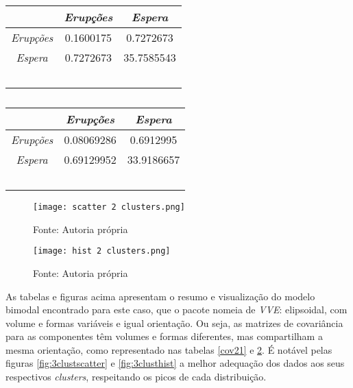 \documentclass[12pt]{article}
\begin{document}
\begin{table}[H]
    \begin{minipage}{0.55\textwidth}
        \centering
        \begin{tabular}{c|cc}
        {} & \textit{Erupções} & \textit{Espera} \\
        \hline
        \textit{Erupções} & 0.1600175 & 0.7272673 \\
        \textit{Espera} & 0.7272673 & 35.7585543 \\
        \hline
        \
        \end{tabular}
        \caption{}\label{cov21}
    \end{minipage}%
    \begin{minipage}{0.55\textwidth}
        \centering
        \begin{tabular}{c|cc}
        {} & \textit{Erupções} & \textit{Espera} \\
        \hline
        \textit{Erupções} & 0.08069286 & 0.6912995 \\
        \textit{Espera} & 0.69129952 & 33.9186657 \\
        \hline
        \
        \end{tabular}
        \caption{}\label{cov22}
    \end{minipage}%
\end{table}

\begin{figure}[H]
    \centering
    \begin{minipage}{0.45\textwidth}
        \caption{}\label{fig:2clustscatter}
        \texttt{[image: scatter 2 clusters.png]}
        \caption*{Fonte: Autoria própria}
    \end{minipage}
    \hfill
    \begin{minipage}{0.45\textwidth}
        \caption{}\label{fig:2clusthist}
        \texttt{[image: hist 2 clusters.png]}
        \caption*{Fonte: Autoria própria}
    \end{minipage}
\end{figure}

As tabelas e figuras acima apresentam o resumo e visualização do modelo bimodal encontrado para este caso, que o pacote nomeia de \textit{VVE}: elipsoidal, com volume e formas variáveis e igual orientação. Ou seja, as matrizes de covariância para as componentes têm volumes e formas diferentes, mas compartilham a mesma orientação, como representado nas tabelas \ref{cov21} e \ref{cov22}. É notável pelas figuras \ref{fig:3clustscatter} e \ref{fig:3clusthist} a melhor adequação dos dados aos seus respectivos \textit{clusters}, respeitando os picos de cada distribuição. 
\end{document}
